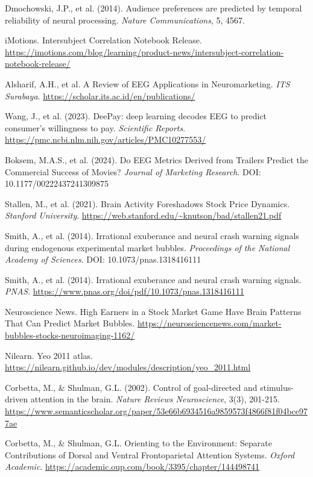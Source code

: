 \documentclass[11pt,letterpaper]{article}
\begin{document}
\begin{list}{}{\setlength{\leftmargin}{2em}\setlength{\itemindent}{-2em}\setlength{\itemsep}{2pt}}
\item[{[24]}] Dmochowski, J.P., et al. (2014). Audience preferences are predicted by temporal reliability of neural processing. \textit{Nature Communications}, 5, 4567.
\item[{[25]}] iMotions. Intersubject Correlation Notebook Release. \url{https://imotions.com/blog/learning/product-news/intersubject-correlation-notebook-release/}
\item[{[26]}] Alsharif, A.H., et al. A Review of EEG Applications in Neuromarketing. \textit{ITS Surabaya}. \url{https://scholar.its.ac.id/en/publications/}
\item[{[27]}] Wang, J., et al. (2023). DeePay: deep learning decodes EEG to predict consumer's willingness to pay. \textit{Scientific Reports}. \url{https://pmc.ncbi.nlm.nih.gov/articles/PMC10277553/}
\item[{[28]}] Boksem, M.A.S., et al. (2024). Do EEG Metrics Derived from Trailers Predict the Commercial Success of Movies? \textit{Journal of Marketing Research}. DOI: 10.1177/00222437241309875
\item[{[29]}] Stallen, M., et al. (2021). Brain Activity Foreshadows Stock Price Dynamics. \textit{Stanford University}. \url{https://web.stanford.edu/~knutson/bad/stallen21.pdf}
\item[{[30]}] Smith, A., et al. (2014). Irrational exuberance and neural crash warning signals during endogenous experimental market bubbles. \textit{Proceedings of the National Academy of Sciences}. DOI: 10.1073/pnas.1318416111
\item[{[31]}] Smith, A., et al. (2014). Irrational exuberance and neural crash warning signals. \textit{PNAS}. \url{https://www.pnas.org/doi/pdf/10.1073/pnas.1318416111}
\item[{[32]}] Neuroscience News. High Earners in a Stock Market Game Have Brain Patterns That Can Predict Market Bubbles. \url{https://neurosciencenews.com/market-bubbles-stocks-neuroimaging-1162/}
\item[{[33]}] Nilearn. Yeo 2011 atlas. \url{https://nilearn.github.io/dev/modules/description/yeo_2011.html}
\item[{[34]}] Corbetta, M., \& Shulman, G.L. (2002). Control of goal-directed and stimulus-driven attention in the brain. \textit{Nature Reviews Neuroscience}, 3(3), 201-215. \url{https://www.semanticscholar.org/paper/53e66b6934516a9859573f4866f81f04bce977ae}
\item[{[35]}] Corbetta, M., \& Shulman, G.L. Orienting to the Environment: Separate Contributions of Dorsal and Ventral Frontoparietal Attention Systems. \textit{Oxford Academic}. \url{https://academic.oup.com/book/3395/chapter/144498741}

\end{list}
\end{document}

